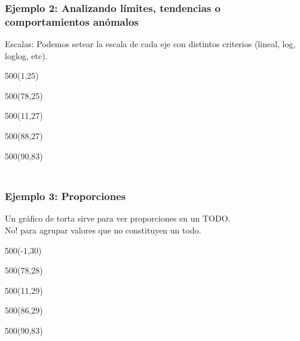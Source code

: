 \documentclass[aspectratio=169]{beamer}
\begin{document}
\begin{frame}[fragile,t]
    \frametitle{ \vspace{-1cm} \flushright \colorbox{verdeuca}{ \small \textcolor{white}{ \footnotesize \secname } }\\
    Ejemplo 2: Analizando límites, tendencias o comportamientos anómalos}
    Escalas: Podemos setear la escala de cada eje con distintos criterios (lineal, log, loglog, etc).
    \begin{textblock}{500}(1,25)   \end{textblock}
    \begin{textblock}{500}(78,25)  \end{textblock}
    \begin{textblock}{500}(11,27)    \end{textblock}
    \begin{textblock}{500}(88,27)  \end{textblock}
    \begin{textblock}{500}(90,83)  \end{textblock}
\end{frame}

\begin{frame}[fragile,t]
    \frametitle{ \vspace{-1cm} \flushright \colorbox{verdeuca}{ \small \textcolor{white}{ \footnotesize \secname } }\\
    Ejemplo 3: Proporciones}
    Un gráfico de torta sirve para  ver proporciones en un TODO. \\ \textcolor{rojo}{No! para agrupar valores que no constituyen un todo.}
    \begin{textblock}{500}(-1,30)  \end{textblock}
    \begin{textblock}{500}(78,28)  \end{textblock}
    \begin{textblock}{500}(11,29)    \end{textblock}
    \begin{textblock}{500}(86,29)  \end{textblock}
    \begin{textblock}{500}(90,83)  \end{textblock}
\end{frame}
\end{document}
